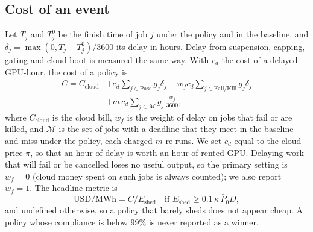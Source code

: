 \subsection{Cost of an event}
Let $T_j$ and $T_j^0$ be the finish time of job $j$ under the policy and in the baseline, and $\delta_j=\max(0,T_j-T_j^0)/3600$ its delay in hours. Delay from suspension, capping, gating and cloud boot is measured the same way. With $c_d$ the cost of a delayed GPU-hour, the cost of a policy is
\begin{equation}
\begin{split}
C=C_{\text{cloud}}&+c_d\!\!\sum_{j\in\text{Pass}}\! g_j\delta_j+w_f c_d\!\!\sum_{j\in\text{Fail/Kill}}\! g_j\delta_j\\
&+m\,c_d\!\!\sum_{j\in\mathcal M}\! g_j\,\tfrac{w_j}{3600},
\end{split}
\end{equation}
where $C_{\text{cloud}}$ is the cloud bill, $w_f$ is the weight of delay on jobs that fail or are killed, and $\mathcal M$ is the set of jobs with a deadline that they meet in the baseline and miss under the policy, each charged $m$ re-runs. We set $c_d$ equal to the cloud price $\pi$, so that an hour of delay is worth an hour of rented GPU. Delaying work that will fail or be cancelled loses no useful output, so the primary setting is $w_f=0$ (cloud money spent on such jobs is always counted); we also report $w_f=1$. The headline metric is
\begin{equation}
\text{USD/MWh}=C/E_{\text{shed}}\quad\text{if }E_{\text{shed}}\ge 0.1\,\kappa\,\bar P_0 D,\label{eq:usdmwh}
\end{equation}
and undefined otherwise, so a policy that barely sheds does not appear cheap. A policy whose compliance is below $99\%$ is never reported as a winner.

\begin{center}
\end{center}
